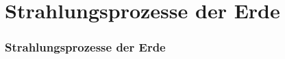 \section{Strahlungsprozesse der Erde}





\begin{frame}
  \frametitle{Strahlungsprozesse der Erde}
\end{frame}

